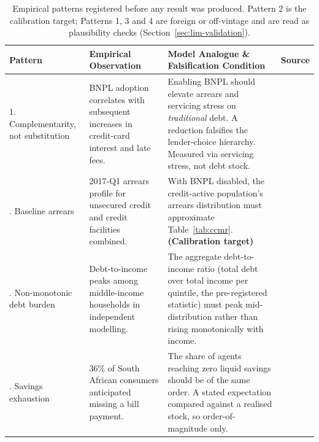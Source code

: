 \begin{table}[H]
\centering
\caption{Empirical patterns registered before any result was produced. Pattern 2 is the
calibration target; Patterns 1, 3 and 4 are foreign or off-vintage and are read as plausibility
checks (Section~\ref{sec:lim-validation}).}

\label{tab:patterns}
\begin{tabular}{L{2.4cm}L{4.2cm}L{4.8cm}L{1.5cm}}
\toprule
\textbf{Pattern} & \textbf{Empirical Observation} & \textbf{Model Analogue \& Falsification Condition} & \textbf{Source} \\
. Complementarity, not substitution & \ac{BNPL} adoption correlates with subsequent increases in credit-card interest and late fees. & Enabling \ac{BNPL} should elevate arrears and servicing stress on \emph{traditional} debt. A reduction falsifies the lender-choice hierarchy. Measured via servicing stress, not debt stock. & \cite{dehaan2024bnpl} \\
. Baseline arrears & 2017-Q1 arrears profile for unsecured credit and credit facilities combined. & With \ac{BNPL} disabled, the credit-active population's arrears distribution must approximate Table~\ref{tab:ccmr}. \textbf{(Calibration target)} & \cite{ncr_ccmr_2017} \\
. Non-monotonic debt burden & Debt-to-income peaks among middle-income households in independent modelling. & The aggregate debt-to-income ratio (total debt over total income per quintile, the pre-registered statistic) must peak mid-distribution rather than rising monotonically with income. & \cite{hamill2023creditcard} \\
. Savings exhaustion & 36\% of South African consumers anticipated missing a bill payment. & The share of agents reaching zero liquid savings should be of the same order. A stated expectation compared against a realised stock, so order-of-magnitude only. & \cite{transunion_cps_sa_2025} \\
\bottomrule
\end{tabular}
\end{table}

